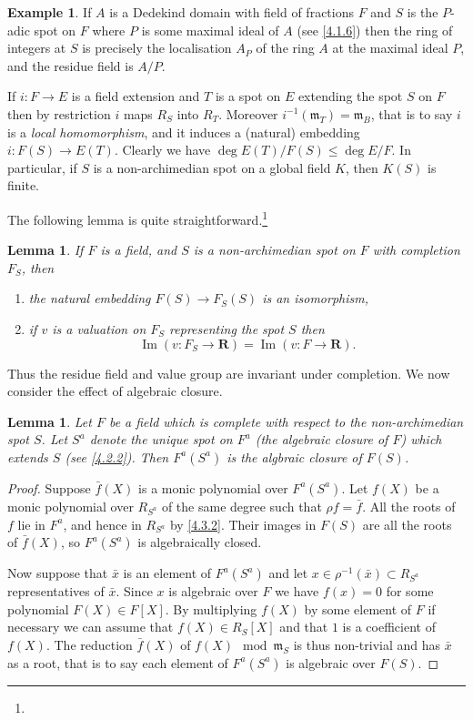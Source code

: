 \documentclass[10pt,leqno]{article}
\newtheorem{lemm}[theo]{Lemma}
\theoremstyle{definition}
\newtheorem{exam}[theo]{Example}
\def\RR{\mathbf{R}}
\def\mm{\mathfrak{m}}
\DeclareMathOperator{\img}{Im}
\def\fnfofo{}
\begin{document}
\begin{exam}
\label{4.3.6}
If $A$ is a Dedekind domain with field of fractions $F$ and $S$ is the $P$-adic spot on $F$ where $P$ is some maximal ideal of $A$ (see \ref{4.1.6}) then the ring of integers at $S$ is precisely the localisation $A_P$ of the ring $A$ at the maximal ideal $P$, and the residue field is $A/P$.

If $i : F \to E$ is a field extension and $T$ is a spot on $E$ extending the spot $S$ on $F$ then by restriction $i$ maps $R_S$ into $R_T$.
Moreover $i^{-1}(\mm_T) = \mm_B$, that is to say $i$ is a \emph{local homomorphism}, and it induces a (natural) embedding $i : F(S) \to E(T)$.
Clearly we have $\deg E(T)/F(S) \leq \deg E/F$.
In particular, if $S$ is a non-archimedian spot on a global field $K$, then $K(S)$ is finite.
\end{exam}


The following lemma is quite straightforward.\footnote{\fnfofo}


\begin{lemm}
\label{4.3.7}
If $F$ is a field, and $S$ is a non-archimedian spot on $F$ with completion $F_S$, then
\begin{enumerate}
\item
\label{4.3.7.1}
the natural embedding $F(S) \to F_S(S)$ is an isomorphism,

\item
\label{4.3.7.2}
if $v$ is a valuation on $F_S$ representing the spot $S$ then
\[
\img(v : F_S \to \RR) = \img(v : F \to \RR).
\]
\end{enumerate}
\end{lemm}


Thus the residue field and value group are invariant under completion.
We now consider the effect of algebraic closure.


\begin{lemm}
\label{4.3.8}
Let $F$ be a field which is complete with respect to the non-archimedian spot $S$.
Let $S^a$ denote the unique spot on $F^a$ (the algebraic closure of $F$) which extends $S$ (see \eqref{4.2.2}).
Then $F^a(S^a)$ is the algbraic closure of $F(S)$.
\end{lemm}

\begin{proof}
Suppose $\bar f(X)$ is a monic polynomial over $F^a(S^a)$.
Let $f(X)$ be a monic polynomial over $R_{S^a}$ of the same degree such that $\rho f = \bar f$.
All the roots of $f$ lie in $F^a$, and hence in $R_{S^a}$ by \ref{4.3.2}.
Their images in $F(S)$ are all the roots of $\bar f(X)$, so $F^a(S^a)$ is algebraically closed.

Now suppose that $\bar x$ is an element of $F^a(S^a)$ and let $x \in \rho^{-1}(\bar x) \subset R_{S^a}$ representatives of $\bar x$.
Since $x$ is algebraic over $F$ we have $f(x) = 0$ for some polynomial $F(X) \in F[X]$.
By multiplying $f(X)$ by some element of $F$ if necessary we can assume that $f(X) \in R_S[X]$ and that $1$ is a coefficient of $f(X)$.
The reduction $\bar f(X)$ of $f(X) \mod \mm_S$ is thus non-trivial and has $\bar x$ as a root, that is to say each element of $F^a(S^a)$ is algebraic over $F(S)$.
\end{proof}
\end{document}
